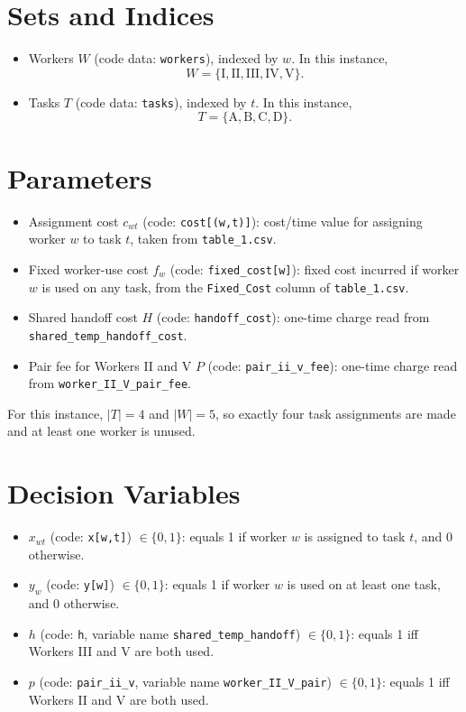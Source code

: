 \section*{Sets and Indices}

\begin{itemize}
    \item Workers $W$ (code data: \texttt{workers}), indexed by $w$. In this instance,
    \[
    W=\{\mathrm{I},\mathrm{II},\mathrm{III},\mathrm{IV},\mathrm{V}\}.
    \]
    \item Tasks $T$ (code data: \texttt{tasks}), indexed by $t$. In this instance,
    \[
    T=\{\mathrm{A},\mathrm{B},\mathrm{C},\mathrm{D}\}.
    \]
\end{itemize}

\section*{Parameters}

\begin{itemize}
    \item Assignment cost $c_{wt}$ (code: \texttt{cost[(w,t)]}): cost/time value for assigning worker $w$ to task $t$, taken from \texttt{table\_1.csv}.
    \item Fixed worker-use cost $f_w$ (code: \texttt{fixed\_cost[w]}): fixed cost incurred if worker $w$ is used on any task, from the \texttt{Fixed\_Cost} column of \texttt{table\_1.csv}.
    \item Shared handoff cost $H$ (code: \texttt{handoff\_cost}): one-time charge read from \texttt{shared\_temp\_handoff\_cost}.
    \item Pair fee for Workers II and V $P$ (code: \texttt{pair\_ii\_v\_fee}): one-time charge read from \texttt{worker\_II\_V\_pair\_fee}.
\end{itemize}

For this instance, $|T|=4$ and $|W|=5$, so exactly four task assignments are made and at least one worker is unused.

\section*{Decision Variables}

\begin{itemize}
    \item $x_{wt}$ (code: \texttt{x[w,t]}) $\in \{0,1\}$: equals 1 if worker $w$ is assigned to task $t$, and 0 otherwise.
    \item $y_w$ (code: \texttt{y[w]}) $\in \{0,1\}$: equals 1 if worker $w$ is used on at least one task, and 0 otherwise.
    \item $h$ (code: \texttt{h}, variable name \texttt{shared\_temp\_handoff}) $\in \{0,1\}$: equals 1 iff Workers III and V are both used.
    \item $p$ (code: \texttt{pair\_ii\_v}, variable name \texttt{worker\_II\_V\_pair}) $\in \{0,1\}$: equals 1 iff Workers II and V are both used.
\end{itemize}

